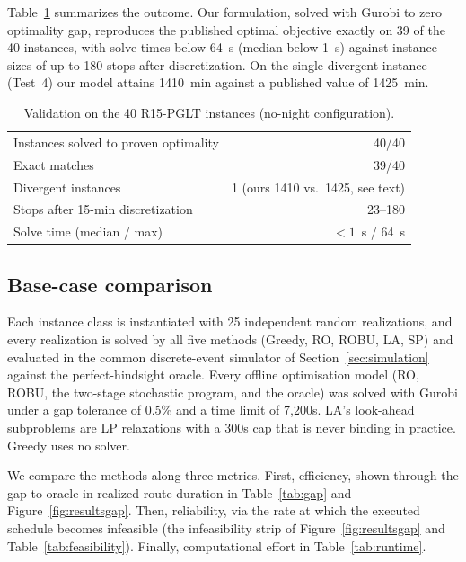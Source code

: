 \documentclass[preprint,12pt,3p]{elsarticle}
\begin{document}
Table~\ref{tab:validation} summarizes the outcome. Our formulation, solved with Gurobi to zero optimality gap, reproduces the published optimal objective exactly on 39 of the 40 instances, with solve times below 64~s (median below 1~s) against instance sizes of up to 180 stops after discretization. On the single divergent instance (Test~4) our model attains 1410~min against a published value of 1425~min.

\begin{table}[htbp]
\centering
\caption{Validation on the 40 R15-PGLT instances (no-night configuration).}
\label{tab:validation}
\small
\begin{tabular}{lr}
\toprule
Instances solved to proven optimality & 40/40 \\
Exact matches & 39/40 \\
Divergent instances & 1 (ours 1410 vs.\ 1425, see text) \\
Stops after 15-min discretization & 23--180 \\
Solve time (median / max) & $<1$~s / 64~s \\
\bottomrule
\end{tabular}
\end{table}


\subsection{Base-case comparison}
\label{sec:basecase}

Each instance class is instantiated with 25 independent random realizations, and every realization is solved by all five methods (Greedy, RO, ROBU, LA, SP) and evaluated in the common discrete-event simulator of Section~\ref{sec:simulation} against the perfect-hindsight oracle.
Every offline optimisation model (RO, ROBU, the two-stage stochastic program, and the oracle) was solved with Gurobi under a gap tolerance of 0.5\% and a time limit of 7,200s. LA's look-ahead subproblems are LP relaxations with a 300s cap that is never binding in practice. Greedy uses no solver.

We compare the methods along three metrics. First, efficiency, shown through the gap to oracle in realized route duration in Table~\ref{tab:gap} and Figure~\ref{fig:resultsgap}. Then, reliability, via the rate at which the executed schedule becomes infeasible (the infeasibility strip of Figure~\ref{fig:resultsgap} and Table~\ref{tab:feasibility}). Finally, computational effort in Table~\ref{tab:runtime}.
\end{document}
